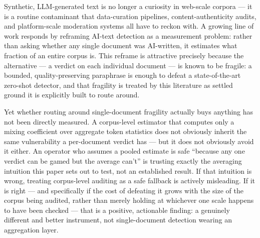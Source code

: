 \documentclass[11pt]{article}
\begin{document}
Synthetic, LLM-generated text is no longer a curiosity in web-scale corpora --- it is a routine contaminant that data-curation pipelines, content-authenticity audits, and platform-scale moderation systems all have to reckon with. A growing line of work responds by reframing AI-text detection as a measurement problem: rather than asking whether any single document was AI-written, it estimates what fraction of an entire corpus is. This reframe is attractive precisely because the alternative --- a verdict on each individual document --- is known to be fragile: a bounded, quality-preserving paraphrase is enough to defeat a state-of-the-art zero-shot detector, and that fragility is treated by this literature as settled ground it is explicitly built to route around.

Yet whether routing around single-document fragility actually buys anything has not been directly measured. A corpus-level estimator that computes only a mixing coefficient over aggregate token statistics does not obviously inherit the same vulnerability a per-document verdict has --- but it does not obviously avoid it either. An operator who assumes a pooled estimate is safe ``because any one verdict can be gamed but the average can't'' is trusting exactly the averaging intuition this paper sets out to test, not an established result. If that intuition is wrong, treating corpus-level auditing as a safe fallback is actively misleading. If it is right --- and specifically if the cost of defeating it grows with the size of the corpus being audited, rather than merely holding at whichever one scale happens to have been checked --- that is a positive, actionable finding: a genuinely different and better instrument, not single-document detection wearing an aggregation layer.
\end{document}

